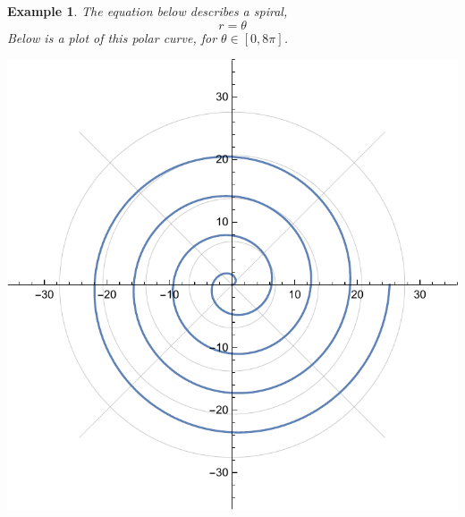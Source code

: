 \documentclass[11pt]{amsart}
\newtheorem{example}{Example}[section]
\numberwithin{equation}{section}
\begin{document}
\begin{example}
The equation below describes a spiral, 
\begin{equation*}
r = \theta
\end{equation*}
Below is a plot of this polar curve, for $\theta \in [0,8\pi]$.
\begin{center}
\includegraphics[scale=0.5]{polar_p3.pdf}
\end{center} 
\end{example}
\end{document}
